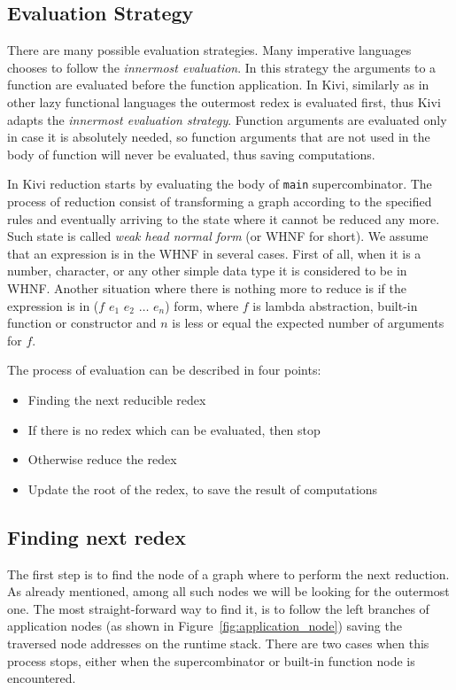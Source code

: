 \documentclass[12pt,a4paper]{report}
\begin{document}
\subsection{Evaluation Strategy}
There are many possible evaluation strategies. Many imperative languages
chooses to follow the \textit{innermost evaluation}. In this strategy the
arguments to a function are evaluated before the function application. In Kivi,
similarly as in other lazy functional languages the outermost redex is
evaluated first, thus Kivi adapts the \textit{innermost evaluation strategy}.
Function arguments are evaluated only in case it is absolutely needed, so
function arguments that are not used in the body of function will never be
evaluated, thus saving computations.

In Kivi reduction starts by evaluating the body of \texttt{main}
supercombinator. The process of reduction consist of transforming a graph
according to the specified rules and eventually arriving to the state where it
cannot be reduced any more. Such state is called \textit{weak head normal form}
(or WHNF for short). We assume that an expression is in the WHNF in several
cases. First of all, when it is a number, character, or any other simple data
type it is considered to be in WHNF. Another situation where there is nothing
more to reduce is if the expression is in ($f$ $e_1$ $e_2$ $\ldots$ $e_n$)
form, where $f$ is lambda abstraction, built-in function or constructor and $n$
is less or equal the expected number of arguments for $f$.

The process of evaluation can be described in four points:

\begin{itemize}
  \item Finding the next reducible redex
  \item If there is no redex which can be evaluated, then stop
  \item Otherwise reduce the redex
  \item Update the root of the redex, to save the result of computations
\end{itemize}

\subsection{Finding next redex}
The first step is to find the node of a graph where to perform the next
reduction. As already mentioned, among all such nodes we will be looking for the
outermost one. The most straight-forward way to find it, is to follow the left
branches of application nodes (as shown in Figure~\ref{fig:application_node})
saving the traversed node addresses on the runtime stack. There are two cases
when this process stops, either when the supercombinator or built-in function
node is encountered.
\end{document}
